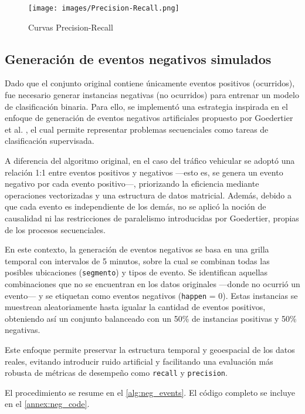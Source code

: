\documentclass[12pt]{article}
\begin{document}
\begin{figure}[H]
    \centering
    \texttt{[image: images/Precision-Recall.png]}
    \caption{Curvas Precision-Recall}
    \label{fig:prec-recall}
\end{figure}

\subsection{Generación de eventos negativos simulados} \label{ssec:class_balancing}

Dado que el conjunto original contiene únicamente eventos positivos (ocurridos), fue necesario generar instancias negativas (no ocurridos) para entrenar un modelo de clasificación binaria. Para ello, se implementó una estrategia inspirada en el enfoque de generación de eventos negativos artificiales propuesto por Goedertier et al. \parencite{goedertier2009robust}, el cual permite representar problemas secuenciales como tareas de clasificación supervisada.

A diferencia del algoritmo original, en el caso del tráfico vehicular se adoptó una relación 1:1 entre eventos positivos y negativos —esto es, se genera un evento negativo por cada evento positivo—, priorizando la eficiencia mediante operaciones vectorizadas y una estructura de datos matricial. Además, debido a que cada evento es independiente de los demás, no se aplicó la noción de causalidad ni las restricciones de paralelismo introducidas por Goedertier, propias de los procesos secuenciales.

En este contexto, la generación de eventos negativos se basa en una grilla temporal con intervalos de 5 minutos, sobre la cual se combinan todas las posibles ubicaciones (\texttt{segmento}) y tipos de evento. Se identifican aquellas combinaciones que no se encuentran en los datos originales —donde no ocurrió un evento— y se etiquetan como eventos negativos (\texttt{happen} = 0). Estas instancias se muestrean aleatoriamente hasta igualar la cantidad de eventos positivos, obteniendo así un conjunto balanceado con un 50\% de instancias positivas y 50\% negativas.

Este enfoque permite preservar la estructura temporal y geoespacial de los datos reales, evitando introducir ruido artificial y facilitando una evaluación más robusta de métricas de desempeño como \texttt{recall} y \texttt{precision}.

El procedimiento se resume en el \autoref{alg:neg_events}. El código completo se incluye en el \autoref{annex:neg_code}.
\end{document}

